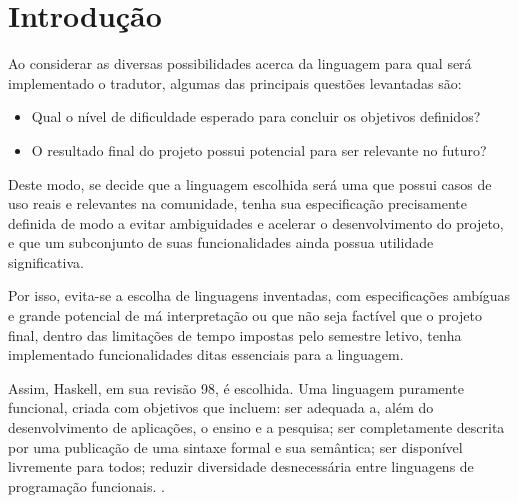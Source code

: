 \documentclass[
	article,			%
	11pt,				%
	oneside,			%
	a4paper,			%
	english,			%
	brazil,				%
	sumario=tradicional
	]{abntex2}
\begin{document}

\begin{center}\smaller


\end{center}

\textual

\section{Introdução}

Ao considerar as diversas possibilidades acerca da linguagem para qual será
implementado o tradutor, algumas das principais questões levantadas são:

\begin{itemize}
	\item Qual o nível de dificuldade esperado para concluir os objetivos definidos?
	\item O resultado final do projeto possui potencial para ser relevante no futuro?
\end{itemize}

Deste modo, se decide que a linguagem escolhida será uma que possui casos de uso reais
e relevantes na comunidade, tenha sua especificação precisamente definida de modo
a evitar ambiguidades e acelerar o desenvolvimento do projeto, e que um subconjunto
de suas funcionalidades ainda possua utilidade significativa.

Por isso, evita-se a escolha de linguagens inventadas, com especificações ambíguas e
 grande potencial de má interpretação ou que não seja factível que o projeto final,
 dentro das limitações de tempo impostas pelo semestre letivo, tenha implementado
 funcionalidades ditas essenciais para a linguagem.

Assim, Haskell, em sua revisão 98, é escolhida. Uma linguagem puramente funcional,
criada com objetivos que incluem: ser adequada a, além do desenvolvimento de aplicações,
o ensino e a pesquisa; ser completamente descrita por uma publicação de uma sintaxe
formal e sua semântica; ser disponível livremente para todos; reduzir diversidade
desnecessária entre linguagens de programação funcionais. \cite[Prefácio]{Haskell98}.
\end{document}
